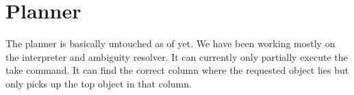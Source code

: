 \section*{Planner}
The planner is basically untouched as of yet. We have been working mostly on
the interpreter and ambiguity resolver. It can currently only partially execute
the take command. It can find the correct column where the requested object
lies but only picks up the top object in that column.


